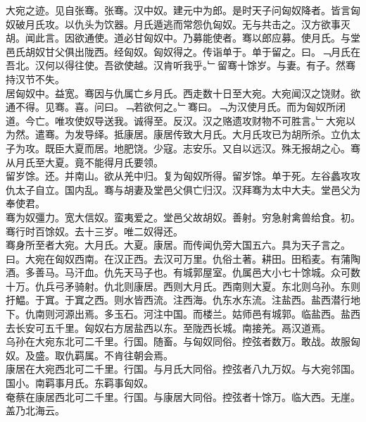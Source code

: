 \documentclass{zhvt-classic}
\begin{document}

\hspace*{2em}大宛之迹。见自张骞。张骞。汉中奴。建元中为郎。是时天子问匈奴降者。皆言匈奴破月氏攻。以仇头为饮器。月氏遁逃而常怨仇匈奴。无与共击之。汉方欲事灭胡。闻此言。因欲通使。道必甘匈奴中。乃募能使者。骞以郎应募。使月氏。与堂邑氏胡奴甘父俱出陇西。经匈奴。匈奴得之。传诣单于。单于留之。曰。﹁月氏在吾北。汉何以得往使。吾欲使越。汉肯听我乎。﹂留骞十馀岁。与妻。有子。然骞持汉节不失。\\
\hspace*{2em}居匈奴中。益宽。骞因与仇属亡乡月氏。西走数十日至大宛。大宛闻汉之饶财。欲通不得。见骞。喜。问曰。﹁若欲何之。﹂骞曰。﹁为汉使月氏。而为匈奴所闭道。今亡。唯攻使奴导送我。诚得至。反汉。汉之赂遗攻财物不可胜言。﹂大宛以为然。遣骞。为发导绎。抵康居。康居传致大月氏。大月氏攻已为胡所杀。立仇太子为攻。既臣大夏而居。地肥饶。少寇。志安乐。又自以远汉。殊无报胡之心。骞从月氏至大夏。竟不能得月氏要领。\\
\hspace*{2em}留岁馀。还。并南山。欲从羌中归。复为匈奴所得。留岁馀。单于死。左谷蠡攻攻仇太子自立。国内乱。骞与胡妻及堂邑父俱亡归汉。汉拜骞为太中大夫。堂邑父为奉使君。\\
\hspace*{2em}骞为奴彊力。宽大信奴。蛮夷爱之。堂邑父故胡奴。善射。穷急射禽兽给食。初。骞行时百馀奴。去十三岁。唯二奴得还。\\
\hspace*{2em}骞身所至者大宛。大月氏。大夏。康居。而传闻仇旁大国五六。具为天子言之。曰。大宛在匈奴西南。在汉正西。去汉可万里。仇俗土著。耕田。田稻麦。有蒲陶酒。多善马。马汗血。仇先天马子也。有城郭屋室。仇属邑大小七十馀城。众可数十万。仇兵弓矛骑射。仇北则康居。西则大月氏。西南则大夏。东北则乌孙。东则扜鰛。于窴。于窴之西。则水皆西流。注西海。仇东水东流。注盐西。盐西潜行地下。仇南则河源出焉。多玉石。河注中国。而楼兰。姑师邑有城郭。临盐西。盐西去长安可五千里。匈奴右方居盐西以东。至陇西长城。南接羌。鬲汉道焉。\\
\hspace*{2em}乌孙在大宛东北可二千里。行国。随畜。与匈奴同俗。控弦者数万。敢战。故服匈奴。及盛。取仇羁属。不肯往朝会焉。\\
\hspace*{2em}康居在大宛西北可二千里。行国。与月氏大同俗。控弦者八九万奴。与大宛邻国。国小。南羁事月氏。东羁事匈奴。\\
\hspace*{2em}奄蔡在康居西北可二千里。行国。与康居大同俗。控弦者十馀万。临大西。无崖。盖乃北海云。\\
\end{document}
